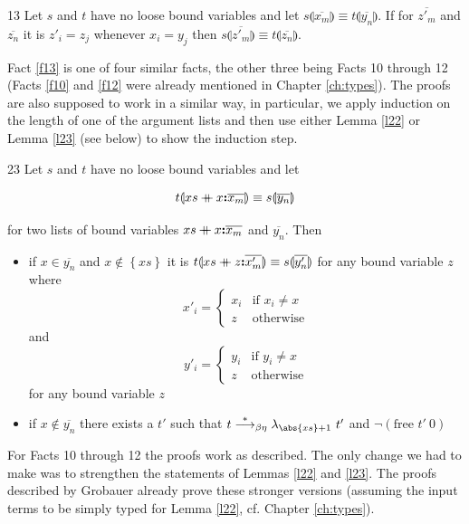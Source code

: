 \begin{fact}{13}
	\label{f13}
	Let $s$ and $t$ have no loose bound variables and let $s \llparenthesis \overline{x_m} \rrparenthesis \equiv t \llparenthesis \overline{y_n} \rrparenthesis$. If for $\overline{z'_m}$ and $\overline{z_n}$ it is $z'_i = z_j$ whenever $x_i = y_j$ then $s \llparenthesis \overline{z'_m} \rrparenthesis \equiv t \llparenthesis \overline{z_n} \rrparenthesis$.
\end{fact}

Fact \ref{f13} is one of four similar facts, the other three being Facts 10 through 12 (Facts \ref{f10} and  \ref{f12} were already mentioned in Chapter \ref{ch:types}). The proofs are also supposed to work in a similar way, in particular, we apply induction on the length of one of the argument lists and then use either Lemma \ref{l22} or Lemma \ref{l23} (see below) to show the induction step.

\begin{lemma}{23}
	\label{l23}
	Let $s$ and $t$ have no loose bound variables and let
	
	\[
	t \llparenthesis xs \mathbin{+\mkern-10mu+} x \textbf{:} \overline{x_m} \rrparenthesis \equiv s  \llparenthesis \overline{y_n} \rrparenthesis
	\]
	
	for two lists of bound variables $xs \mathbin{+\mkern-10mu+} x \textbf{:} \overline{x_m}$ and $\overline{y_n}$. Then
	\begin{itemize}
		\item if $x \in \overline{y_n}$ and $x \notin \left\{ xs \right\}$ it is $t \llparenthesis xs \mathbin{+\mkern-10mu+} z \textbf{:} \overline{x'_m} \rrparenthesis \equiv s  \llparenthesis \overline{y'_n} \rrparenthesis$ for any bound variable $z$ where
		\[
		x'_i = 
		\begin{cases}
			x_i & \text{if } x_i \neq x \\
			z & \text{otherwise}
		\end{cases}
		\]
		and
		\[
		y'_i =
		\begin{cases}
			y_i & \text{if } y_i \neq x \\
			z & \text {otherwise}
		\end{cases}
		\]
		for any bound variable $z$
		\item if $x \notin \overline{y_n}$ there exists a $t'$ such that $t \betaetas \abstrm{\abs{xs} + 1}{t'}$ and $\neg \left( \text{free } t' \ 0 \right)$
	\end{itemize}
\end{lemma}

For Facts 10 through 12 the proofs work as described. The only change we had to make was to strengthen the statements of Lemmas \ref{l22} and \ref{l23}. The proofs described by Grobauer already prove these stronger versions (assuming the input terms to be simply typed for Lemma \ref{l22}, cf. Chapter \ref{ch:types}).

